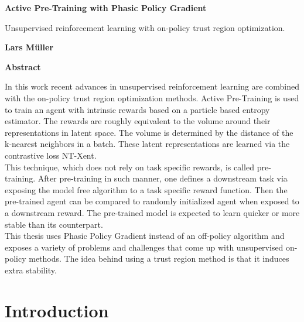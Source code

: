 \documentclass{article}
\begin{document}
\newpage
\thispagestyle{plain}
\begin{center}
    \Large
    \textbf{Active Pre-Training with Phasic Policy Gradient}
        
    \vspace{0.4cm}
    \large
    Unsupervised reinforcement learning with on-policy trust region
    optimization.
        
    \vspace{0.4cm}
    \textbf{Lars Müller}
       
    \vspace{0.9cm}
    \textbf{Abstract}
\end{center}
In this work recent advances in unsupervised reinforcement learning are combined with the on-policy trust region optimization methods.
Active Pre-Training is used to train an agent with intrinsic rewards based on a particle based entropy estimator. The rewards
are roughly equivalent to the volume around their representations in latent space. The volume is determined by the distance 
of the k-nearest neighbors in a batch. These latent
representations are learned via the contrastive loss NT-Xent.\\
This technique, which does not rely on task specific rewards, is called pre-training.
After pre-training in such manner, one defines a downstream task via exposing the model free algorithm to a task specific
reward
function. Then the pre-trained agent can be compared to randomly initialized agent when exposed to a downstream reward. The
pre-trained model is expected to learn quicker or more stable than its counterpart.\\
This thesis uses Phasic Policy Gradient instead of an off-policy algorithm and
exposes a variety of problems and challenges that come up with unsupervised on-policy methods.
The idea behind using a trust region method is that it induces extra stability.
\newpage

\tableofcontents
\newpage

\section{Introduction}
\end{document}
